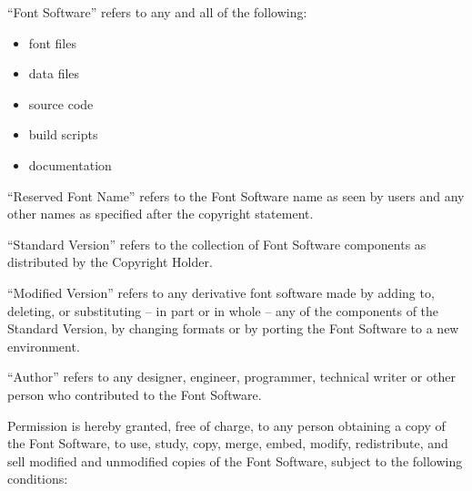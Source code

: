 \documentclass{fontdokuold}
\begin{document}

"`Font Software"' refers to any and all of the following:
\begin{itemize}
\item font files
\item data files
\item source code
\item build scripts
\item documentation
\end{itemize}

"`Reserved Font Name"' refers to the Font Software name as seen by
users and any other names as specified after the copyright statement.

"`Standard Version"' refers to the collection of Font Software
components as distributed by the Copyright Holder.

"`Modified Version"'  refers to any derivative font software made by
adding to, deleting, or substituting -- in part or in whole --
any of the components of the Standard Version, by changing formats
or by porting the Font Software to a new environment.

"`Author"' refers to any designer, engineer, programmer, technical
writer or other person who contributed to the Font Software.


Permission is hereby granted, free of charge, to any person obtaining
a copy of the Font Software, to use, study, copy, merge, embed, modify,
redistribute, and sell modified and unmodified copies of the Font
Software, subject to the following conditions:
\end{document}
